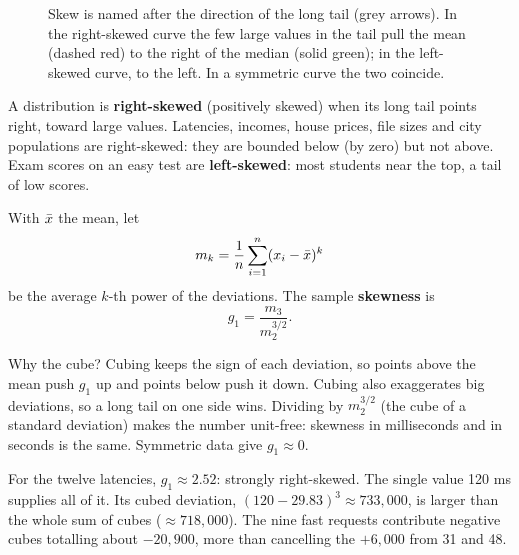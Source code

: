 \begin{figure}[H]
\caption{Skew is named after the direction of the long tail (grey arrows). In the
right-skewed curve the few large values in the tail pull the mean (dashed red) to the right
of the median (solid green); in the left-skewed curve, to the left. In a symmetric curve the
two coincide.}
\label{fig:quantiles-skew-shapes}
\end{figure}

A distribution is \textbf{right-skewed} (positively skewed) when its long tail points
right, toward large values. Latencies, incomes, house prices, file sizes and city
populations are right-skewed: they are bounded below (by zero) but not above. Exam
scores on an easy test are \textbf{left-skewed}: most students near the top, a tail of
low scores.

\begin{definition}
With $\bar{x}$ the mean, let
\[
  m_k = \frac{1}{n} \sum_{i=1}^n (x_i - \bar{x})^k
\]
be the average $k$-th power of the deviations. The sample \textbf{skewness} is
\[
  g_1 = \frac{m_3}{m_2^{3/2}} .
\]
\end{definition}

Why the cube? Cubing keeps the sign of each deviation, so points above the mean push
$g_1$ up and points below push it down. Cubing also exaggerates big deviations, so a
long tail on one side wins. Dividing by $m_2^{3/2}$ (the cube of a standard deviation)
makes the number unit-free: skewness in milliseconds and in seconds is the same.
Symmetric data give $g_1 \approx 0$.

For the twelve latencies, $g_1 \approx 2.52$: strongly right-skewed. The single value
120 ms supplies all of it. Its cubed deviation, $(120 - 29.83)^3 \approx 733{,}000$, is
larger than the whole sum of cubes ($\approx 718{,}000$). The nine fast requests
contribute negative cubes totalling about $-20{,}900$, more than cancelling the
$+6{,}000$ from 31 and 48.

